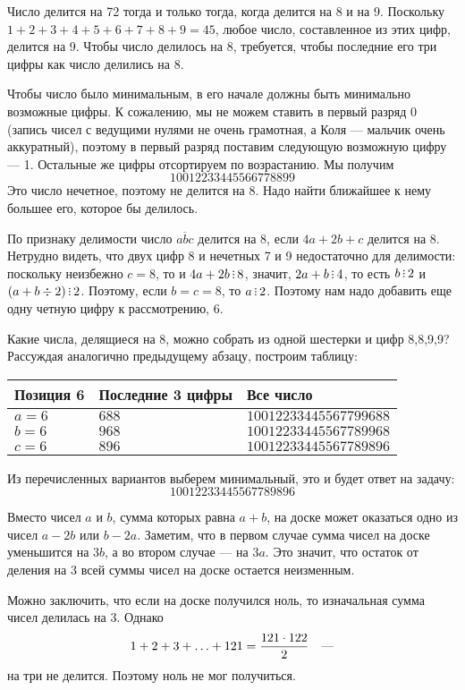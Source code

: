 ﻿
\begin{itemize}
\itA Число делится на 72 тогда и только тогда, когда делится на 8 и на 9.
Поскольку $1+2+3+4+5+6+7+8+9 = 45$, любое число, составленное из этих цифр, делится на 9.
Чтобы число делилось на 8, требуется, чтобы последние его три цифры как число делились
на 8. 

Чтобы число было минимальным, в его начале должны быть минимально возможные цифры.
К сожалению, мы не можем ставить в первый разряд 0 (запись чисел с ведущими нулями не 
очень грамотная, а Коля --- мальчик очень аккуратный), поэтому в первый разряд поставим
следующую возможную цифру --- 1. Остальные же цифры отсортируем по возрастанию.
Мы получим $$10012233445566778899$$
Это число нечетное, поэтому не делится на 8.
Надо найти ближайшее к нему большее его, которое бы делилось.

По признаку
делимости число $\overline{abc}$ делится на 8, если $4a + 2b +c$ делится на 8.
Нетрудно видеть, что двух цифр 8 и нечетных 7 и 9 недостаточно для делимости:
поскольку неизбежно $c = 8$, то и $4a + 2b \divsby 8$, значит, $2a+b \divsby 4$, 
то есть $b \divsby 2$ и $(a + b \div 2) \divsby 2$. Поэтому, если $b = c = 8$,
то $a \divsby 2$. Поэтому нам надо добавить еще одну четную цифру к рассмотрению,
6.

Какие числа, делящиеся на 8, можно собрать из одной шестерки и цифр 8,8,9,9? 
Рассуждая аналогично предыдущему абзацу, построим таблицу:

\begin{center}\begin{tabular}{lll}
Позиция 6 & Последние 3 цифры & Все число\\
\hline
$a=6$ & $688$ & $10012233445567799688$\\
$b=6$ & $968$ & $10012233445567789968$\\
$c=6$ & $896$ & $10012233445567789896$
\end{tabular}\end{center}

Из перечисленных вариантов выберем минимальный, это и будет ответ на задачу:
$$10012233445567789896$$

\itB Вместо чисел $a$ и $b$, сумма которых равна $a+b$, на доске может оказаться
одно из чисел $a-2b$ или $b-2a$. Заметим, что в первом случае сумма чисел
на доске уменьшится на $3b$, а во втором случае — на $3a$. Это значит, что остаток
от деления на 3 всей суммы чисел на доске остается неизменным.

Можно заключить, что если на доске получился ноль, то изначальная сумма чисел делилась на 3. Однако
	$$1+2+3+\ldots+121 = \frac{121 \cdot 122}{2}\text{\quad —}$$
на три не делится. Поэтому ноль не мог получиться.


\end{itemize}
